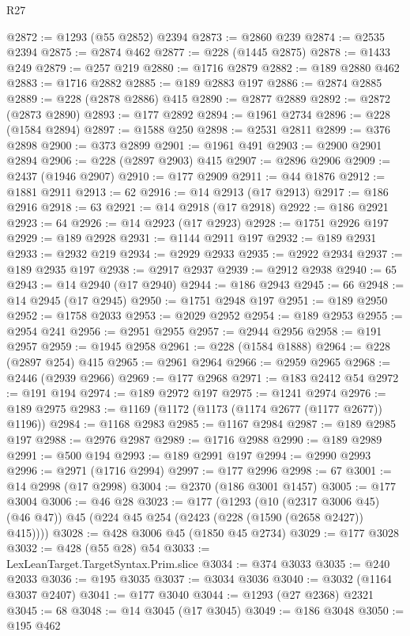 \begin{lexlean}{R27}
\begin{coremodule}
@2872 := @1293 (@55 @2852) @2394
@2873 := @2860 @239
@2874 := @2535 @2394
@2875 := @2874 @462
@2877 := @228 (@1445 @2875)
@2878 := @1433 @249
@2879 := @257 @219
@2880 := @1716 @2879
@2882 := @189 @2880 @462
@2883 := @1716 @2882
@2885 := @189 @2883 @197
@2886 := @2874 @2885
@2889 := @228 (@2878 @2886) @415
@2890 := @2877 @2889
@2892 := @2872 (@2873 @2890)
@2893 := @177 @2892
@2894 := @1961 @2734
@2896 := @228 (@1584 @2894)
@2897 := @1588 @250
@2898 := @2531 @2811
@2899 := @376 @2898
@2900 := @373 @2899
@2901 := @1961 @491
@2903 := @2900 @2901 @2894
@2906 := @228 (@2897 @2903) @415
@2907 := @2896 @2906
@2909 := @2437 (@1946 @2907)
@2910 := @177 @2909
@2911 := @44 @1876
@2912 := @1881 @2911
@2913 := 62
@2916 := @14 @2913 (@17 @2913)
@2917 := @186 @2916
@2918 := 63
@2921 := @14 @2918 (@17 @2918)
@2922 := @186 @2921
@2923 := 64
@2926 := @14 @2923 (@17 @2923)
@2928 := @1751 @2926 @197
@2929 := @189 @2928
@2931 := @1144 @2911 @197
@2932 := @189 @2931
@2933 := @2932 @219
@2934 := @2929 @2933
@2935 := @2922 @2934
@2937 := @189 @2935 @197
@2938 := @2917 @2937
@2939 := @2912 @2938
@2940 := 65
@2943 := @14 @2940 (@17 @2940)
@2944 := @186 @2943
@2945 := 66
@2948 := @14 @2945 (@17 @2945)
@2950 := @1751 @2948 @197
@2951 := @189 @2950
@2952 := @1758 @2033
@2953 := @2029 @2952
@2954 := @189 @2953
@2955 := @2954 @241
@2956 := @2951 @2955
@2957 := @2944 @2956
@2958 := @191 @2957
@2959 := @1945 @2958
@2961 := @228 (@1584 @1888)
@2964 := @228 (@2897 @254) @415
@2965 := @2961 @2964
@2966 := @2959 @2965
@2968 := @2446 (@2939 @2966)
@2969 := @177 @2968
@2971 := @183 @2412 @54
@2972 := @191 @194
@2974 := @189 @2972 @197
@2975 := @1241 @2974
@2976 := @189 @2975
@2983 := @1169 (@1172 (@1173 (@1174 @2677 (@1177 @2677)) @1196))
@2984 := @1168 @2983
@2985 := @1167 @2984
@2987 := @189 @2985 @197
@2988 := @2976 @2987
@2989 := @1716 @2988
@2990 := @189 @2989
@2991 := @500 @194
@2993 := @189 @2991 @197
@2994 := @2990 @2993
@2996 := @2971 (@1716 @2994)
@2997 := @177 @2996
@2998 := 67
@3001 := @14 @2998 (@17 @2998)
@3004 := @2370 (@186 @3001 @1457)
@3005 := @177 @3004
@3006 := @46 @28
@3023 := @177
    (@1293
      (@10 (@2317 @3006 @45) (@46 @47))
      @45
      (@224 @45 @254 (@2423 (@228 (@1590 (@2658 @2427)) @415))))
@3028 := @428 @3006 @45 (@1850 @45 @2734)
@3029 := @177 @3028
@3032 := @428 (@55 @28) @54
@3033 := LexLeanTarget.TargetSyntax.Prim.slice
@3034 := @374 @3033
@3035 := @240 @2033
@3036 := @195 @3035
@3037 := @3034 @3036
@3040 := @3032 (@1164 @3037 @2407)
@3041 := @177 @3040
@3044 := @1293 (@27 @2368) @2321
@3045 := 68
@3048 := @14 @3045 (@17 @3045)
@3049 := @186 @3048
@3050 := @195 @462

\end{coremodule}
\end{lexlean}
